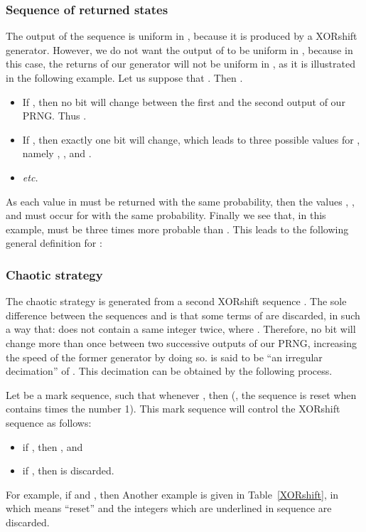 \documentclass[10pt, a4paper, conference, compsocconf]{IEEEtran}
\begin{document}
\subsubsection{Sequence  of returned states}
\label{algo m}
The output of the sequence  is uniform in , because it is produced by a XORshift generator. However, we do not want the output of  to be uniform in , because in this case, the returns of our generator will not be uniform in , as it is illustrated in the following example. Let us suppose that . Then .
\begin{itemize}
\item If , then no bit will change between the first and the second output of our PRNG. Thus .
\item If , then exactly one bit will change, which leads to three possible values for , namely , , and .
\item \emph{etc.}
\end{itemize}
As each value in  must be returned with the same probability, then the values , ,  and  must occur for  with the same probability. Finally we see that, in this example,  must be three times more probable than .
This leads to the following general definition for :







\subsubsection{Chaotic strategy}
\label{Chaotic strategy}
The chaotic strategy  is generated from a second XORshift sequence . The sole difference between the sequences  and  is that some terms of  are discarded, in such a way that:  does not contain a same integer twice, where . Therefore, no bit will change more than once between two successive outputs of our PRNG, increasing the speed of the former generator by doing so.  is said to be ``an irregular decimation'' of . This decimation can be obtained by the following process.

Let  be a mark sequence, such that whenever , 
then  (, the sequence is reset when  contains  times the number 1). This mark sequence will control the XORshift sequence  as follows:
\begin{itemize}
\item if , then ,  and 
\item if , then  is discarded.
\end{itemize}
For example, if  and , then  Another example is given in Table~\ref{XORshift}, in which  means ``reset'' and the integers which are underlined in sequence  are discarded.
\end{document}
